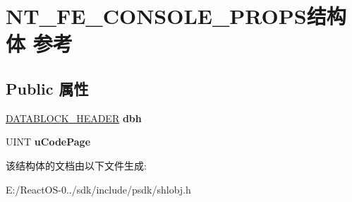 \hypertarget{struct_n_t___f_e___c_o_n_s_o_l_e___p_r_o_p_s}{}\section{N\+T\+\_\+\+F\+E\+\_\+\+C\+O\+N\+S\+O\+L\+E\+\_\+\+P\+R\+O\+P\+S结构体 参考}
\label{struct_n_t___f_e___c_o_n_s_o_l_e___p_r_o_p_s}
\subsection*{Public 属性}
\begin{DoxyCompactItemize}
\item 
\mbox{\label{struct_n_t___f_e___c_o_n_s_o_l_e___p_r_o_p_s_a022443c5e4aa6c5f67d4d4710f736875}} 
\hyperlink{structtag_d_a_t_a_b_l_o_c_k_h_e_a_d_e_r}{D\+A\+T\+A\+B\+L\+O\+C\+K\+\_\+\+H\+E\+A\+D\+ER} {\bfseries dbh}
\item 
\mbox{\label{struct_n_t___f_e___c_o_n_s_o_l_e___p_r_o_p_s_aae635d465674d91b17d118b6845c99aa}} 
U\+I\+NT {\bfseries u\+Code\+Page}
\end{DoxyCompactItemize}


该结构体的文档由以下文件生成\+:\begin{DoxyCompactItemize}
\item 
E\+:/\+React\+O\+S-\/0../sdk/include/psdk/shlobj.\+h\end{DoxyCompactItemize}
